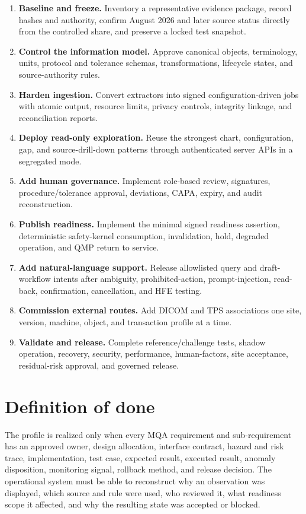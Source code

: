 \documentclass[11pt,letterpaper]{article}
\begin{document}
\begin{enumerate}
\item \textbf{Baseline and freeze.} Inventory a representative evidence package, record hashes and authority, confirm August 2026 and later source status directly from the controlled share, and preserve a locked test snapshot.
\item \textbf{Control the information model.} Approve canonical objects, terminology, units, protocol and tolerance schemas, transformations, lifecycle states, and source-authority rules.
\item \textbf{Harden ingestion.} Convert extractors into signed configuration-driven jobs with atomic output, resource limits, privacy controls, integrity linkage, and reconciliation reports.
\item \textbf{Deploy read-only exploration.} Reuse the strongest chart, configuration, gap, and source-drill-down patterns through authenticated server APIs in a segregated mode.
\item \textbf{Add human governance.} Implement role-based review, signatures, procedure/tolerance approval, deviations, CAPA, expiry, and audit reconstruction.
\item \textbf{Publish readiness.} Implement the minimal signed readiness assertion, deterministic safety-kernel consumption, invalidation, hold, degraded operation, and QMP return to service.
\item \textbf{Add natural-language support.} Release allowlisted query and draft-workflow intents after ambiguity, prohibited-action, prompt-injection, read-back, confirmation, cancellation, and HFE testing.
\item \textbf{Commission external routes.} Add DICOM and TPS associations one site, version, machine, object, and transaction profile at a time.
\item \textbf{Validate and release.} Complete reference/challenge tests, shadow operation, recovery, security, performance, human-factors, site acceptance, residual-risk approval, and governed release.
\end{enumerate}

\section{Definition of done}

The profile is realized only when every MQA requirement and sub-requirement has an approved owner, design allocation, interface contract, hazard and risk trace, implementation, test case, expected result, executed result, anomaly disposition, monitoring signal, rollback method, and release decision. The operational system must be able to reconstruct why an observation was displayed, which source and rule were used, who reviewed it, what readiness scope it affected, and why the resulting state was accepted or blocked.
\end{document}
